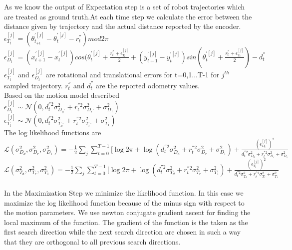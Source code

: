 \documentclass[12pt]{dalcsthesis}
\begin{document}
{As we know the output of Expectation step is a set of robot trajectories which are treated as ground truth.At each time step we calculate the error between the distance given by trajectory and the actual distance reported by the encoder.
\\
$\epsilon_{T_{t}}^{[j]}=(\theta_{t_{+1}}^{'[j]}-\theta_{t}^{'[j]}-r_{t}^{''})mod2\pi$ 
\\
$\epsilon_{D_{t}}^{[j]}=(x_{t+1}^{'[j]}-x_{t}^{'[j]})cos(\theta_{t}^{'[j]}+\frac{r_{t}^{''}+\epsilon_{T_{t}}^{[j]}}{2}+(y_{t+1}^{'[j]}-y_{t}^{'[j]})sin(\theta_{t}^{'[j]}+\frac{r_{t}^{''}+\epsilon_{T_{t}}^{[j]}}{2})-d_{t}^{''}$
\\
$\epsilon_{T_{t}}^{[j]}$ and $\epsilon_{D_{t}}^{[j]}$ are rotational and translational errors for t=0,1...T-1 for $j^{th}$ sampled trajectory. $r_{t}^{''}$ and $d_{t}^{''}$ are the reported odometry values. 
\\
Based on the motion model described 
\\
$\epsilon_{D_{t}}^{[j]}\sim\mathcal{{N}}(0,d_{t}^{''2}\sigma_{D_{d^{''}}}^{2}+r_{t}^{''2}\sigma_{D_{r^{''}}}^{2}+\sigma_{D_{1}}^{2})$
\\
$\epsilon_{T_{t}}^{[j]}\sim\mathcal{{N}}(0,d_{t}^{''2}\sigma_{T_{d^{''}}}^{2}+r_{t}^{''2}\sigma_{T_{r^{''}}}^{2}+\sigma_{T_{1}}^{2})$
\\
The log likelihood functions are
\\
$\mathcal{{L}}(\sigma_{D_{d}}^{2},\sigma_{D_{r}}^{2},\sigma_{D_{1}}^{2})=-\frac{1}{2}\sum_{j}\sum_{t=0}^{T-1}[\log2\pi+\log(d_{t}^{''2}\sigma_{D_{d}}^{2}+r_{t}^{''2}\sigma_{D_{r}}^{2}+\sigma_{D_{1}}^{2})+\frac{(\epsilon_{D_{t}}^{[j]})^{2}}{d_{t}^{''2}\sigma_{D_{d}}^{2}+r_{t}^{''2}\sigma_{D_{r}}^{2}+\sigma_{D_{1}}^{2}}$
\\
$\mathcal{{L}}(\sigma_{T_{d}}^{2},\sigma_{T_{r}}^{2},\sigma_{T_{1}}^{2})=-\frac{1}{2}\sum_{j}\sum_{t=0}^{T-1}[\log2\pi+\log(d_{t}^{''2}\sigma_{T_{d}}^{2}+r_{t}^{''2}\sigma_{T_{r}}^{2}+\sigma_{T_{1}}^{2})+\frac{(\epsilon_{T_{t}}^{[j]})^{2}}{d_{t}^{''2}\sigma_{T_{d}}^{2}+r_{t}^{''2}\sigma_{T_{r}}^{2}+\sigma_{T_{1}}^{2}}$
\\
\\
In the Maximization Step we minimize the likelihood function. In this
case we maximize the log likelihood function because of the minus
sign with respect to the motion parameters. We use newton conjugate
gradient ascent for finding the local maximum of the function. The
gradient of the function is the taken as the first search direction
while the next search direction are chosen in such a way that they
are orthogonal to all previous search directions.

}
\end{document}
